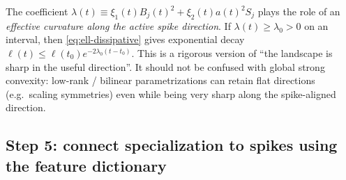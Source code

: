 \begin{remark}
The coefficient $\lambda(t)\equiv \xi_1(t)B_j(t)^2+\xi_2(t)a(t)^2S_j$ plays the role of an \emph{effective curvature along the active spike direction}.
If $\lambda(t)\ge \lambda_0>0$ on an interval, then \eqref{eq:ell-dissipative} gives exponential decay $\ell(t)\le \ell(t_0)e^{-2\lambda_0(t-t_0)}$.
This is a rigorous version of ``the landscape is sharp in the useful direction''.
It should not be confused with global strong convexity: low-rank / bilinear parametrizations can retain flat directions (e.g.\ scaling symmetries) even while being very sharp along the spike-aligned direction.
\end{remark}

\subsection{Step 5: connect specialization to spikes using the feature dictionary}

